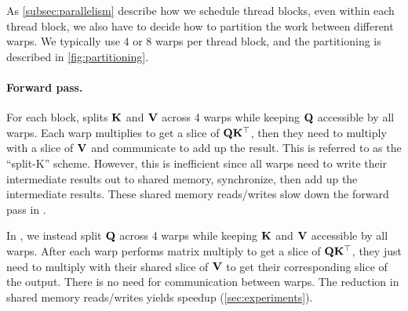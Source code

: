 As \cref{subsec:parallelism} describe how we schedule thread blocks, even within
each thread block, we also have to decide how to partition the work between
different warps.
We typically use 4 or 8 warps per thread block, and the partitioning is described
in \cref{fig:partitioning}.

\paragraph{Forward pass.}
For each block, \sysnameone splits $\mathbf{K}$ and $\mathbf{V}$ across 4 warps while keeping
$\mathbf{Q}$ accessible by all warps.
Each warp multiplies to get a slice of $\mathbf{Q} \mathbf{K}^\top$, then they need to multiply
with a slice of $\mathbf{V}$ and communicate to add up the result.
This is referred to as the ``split-K'' scheme.
However, this is inefficient since all warps need to write their intermediate
results out to shared memory, synchronize, then add up the intermediate results.
These shared memory reads/writes slow down the forward pass in \sysnameone.

In \sysname, we instead split $\mathbf{Q}$ across 4 warps while keeping $\mathbf{K}$ and $\mathbf{V}$
accessible by all warps.
After each warp performs matrix multiply to get a slice of $\mathbf{Q} \mathbf{K}^\top$, they just need to
multiply with their shared slice of $\mathbf{V}$ to get their corresponding
slice of the output.
There is no need for communication between warps.
The reduction in shared memory reads/writes yields speedup (\cref{sec:experiments}).

